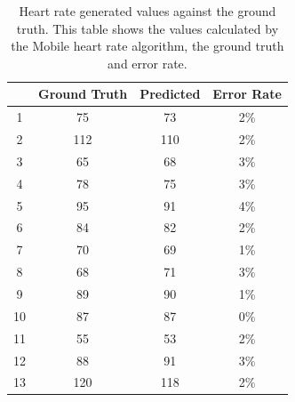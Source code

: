 \documentclass{bmcart}
\begin{document}
\begin{table}[h!]
\caption{Heart rate generated values against the ground truth. This table shows the values calculated by the Mobile heart rate algorithm, the ground truth and error rate.}
      \begin{tabular}{cccc}
        \hline
           & Ground Truth  & Predicted & Error Rate\\ \hline
        1 & 75 & 73  & 2\%\\
        2 & 112& 110 & 2\%\\
        3 & 65 & 68  & 3\%\\
        4 & 78 & 75  & 3\%\\
        5 & 95 & 91  & 4\%\\
        6 & 84 & 82  & 2\%\\
        7 & 70 & 69  & 1\%\\
        8 & 68 & 71  & 3\%\\
        9 & 89 & 90  & 1\%\\
        10& 87 & 87  & 0\%\\
        11& 55 & 53  & 2\%\\
        12& 88 & 91  & 3\%\\
        13& 120& 118 & 2\%\\ \hline
      \end{tabular}
\end{table}
\end{document}
